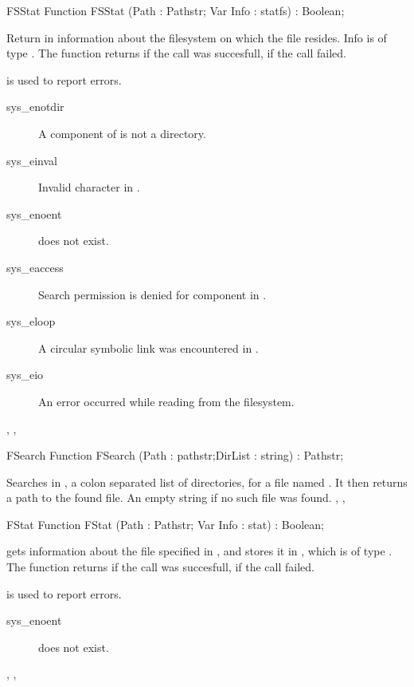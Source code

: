 \begin{function}{FSStat}
\Declaration
Function FSStat (Path : Pathstr; Var Info : statfs) : Boolean;

\Description
 Return in  information about the filesystem on which the file
 resides. Info is of type .
The function returns  if the call was succesfull,  if the call
failed.

\Errors
  is used to report errors.
\begin{description}
\item[sys\_enotdir] A component of  is not a directory.
\item[sys\_einval] Invalid character in .
\item[sys\_enoent]  does not exist.
\item[sys\_eaccess] Search permission is denied for  component in
.
\item[sys\_eloop] A circular symbolic link was encountered in .
\item[sys\_eio] An error occurred while reading from the filesystem.
\end{description}

\SeeAlso
{}, , 
\end{function}
\html{}
\begin{function}{FSearch}
\Declaration
Function FSearch (Path : pathstr;DirList : string) : Pathstr;

\Description
 Searches in , a colon separated list of directories,
for a file named . It then returns a path to the found file.
\Errors
An empty string if no such file was found.
\SeeAlso
{}, ,  
\end{function}
\html{}
\begin{function}{FStat}
\Declaration
Function FStat (Path : Pathstr; Var Info : stat) : Boolean;

\Description

 gets information about the file specified in , and stores it in 
, which is of type .
The function returns  if the call was succesfull,  if the call
failed.

\Errors
  is used to report errors.
\begin{description}
\item[sys\_enoent]  does not exist.
\end{description}

\SeeAlso
{}, , 
\end{function}
